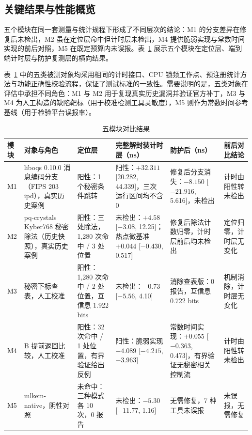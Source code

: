 \subsection{关键结果与性能概览}

五个模块在同一套测量与统计规程下形成了不同层次的结论：M1 的分支差异在修复后未检出，M2 虽在定位层命中但计时层未检出，M4 提供脆弱实现与常数时间实现的前后对照，M5 在既定预算内未误报。表~\ref{tab:modules} 展示五个模块在定位层、端到端计时层与防护复测层的横向结果。

表~\ref{tab:modules} 中的五类被测对象均采用相同的计时接口、CPU 锁频工作点、预注册统计方法与功能正确性校验流程，保证了测试标准的一致性。需要说明的是，五类对象在评估中承担不同角色：M1 与 M2 用于复现真实历史漏洞并验证官方补丁，M3 与 M4 为人工构造的缺陷靶标（用于校准检测工具灵敏度），M5 则作为常数时间参考基线（用于检验平台误报率）。

\begin{table}[H]
\centering
\caption{五模块对比结果}
\label{tab:modules}
{\footnotesize
\begin{tabularx}{\textwidth}{|>{\raggedright\arraybackslash}p{0.8cm}|>{\raggedright\arraybackslash}p{3.6cm}|>{\raggedright\arraybackslash}p{2.7cm}|>{\raggedright\arraybackslash}p{3.1cm}|>{\raggedright\arraybackslash}p{2.9cm}|>{\raggedright\arraybackslash}X|}
\hline
模块 & 对象与角色 & 定位层 & 完整解封装计时层（ns） & 防护后（ns） & 前后对比结论 \\
\hline
M1 & liboqs 0.10.0 消息编码分支（FIPS 203 ipd），真实历史案例 & 阳性：1 个秘密条件跳转 & 阳性：$+32.311$ [20.282, 44.339]，三次运行区间均不含 0 & 修复后分支消失：$-8.150$ [$-21.916$, 5.616]，未检出 & 计时由阳性转未检出 \\
\hline
M2 & pq-crystals Kyber768 秘密除法（历史快照），真实历史案例 & 阳性：三处除法，1,280 次命中 / 3 处位置 & 未检出：$+4.58$ [$-3.08$, 12.25]；热点微基准 $+0.044$ [$-0.430$, 0.517] & 修复后除法计数归零，计时层前后均未检出 & 定位归零，计时层无变化 \\
\hline
M3 & 秘密下标查表，人工校准 & 阳性：1,280 次命中 / 2 处位置，互信息 1.922 bits & 未检出：$-0.73$ [$-5.56$, 4.10] & 消除查表版：0 报告，互信息 0.722 bits & 机制消除，计时层无变化 \\
\hline
M4 & 32 B 提前返回比较，人工校准 & 阳性：32 次命中 / 1 处位置，有界验证给出反例 & 阳性：脆弱实现 $-4.089$ [$-4.215$, $-3.963$] & 常数时间实现：$+0.055$ [$-0.363$, 0.473]，有界验证无秘密相关控制流 & 计时由阳性转未检出 \\
\hline
M5 & mlkem-native，阴性对照 & 未命中：三种模式各 10 次，0 报告 & 未检出：$-5.30$ [$-11.77$, 1.16] & 无需修复，7 种工具未误报 & 未误报，无需修复 \\
\hline
\end{tabularx}
}
\end{table}

